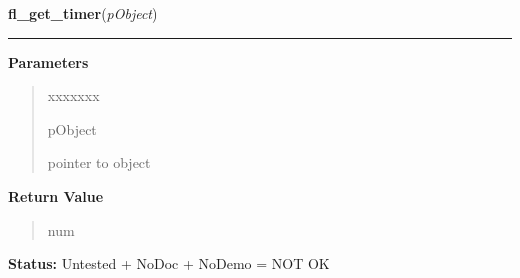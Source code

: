 \hspace{.8\funcindent}\begin{boxedminipage}{\funcwidth}

    \raggedright \textbf{fl\_get\_timer}(\textit{pObject})

    \vspace{-1.5ex}

    \rule{\textwidth}{0.5\fboxrule}
\setlength{\parskip}{2ex}
\setlength{\parskip}{1ex}
      \textbf{Parameters}
      \vspace{-1ex}

      \begin{quote}
        \begin{Ventry}{xxxxxxx}

          \item[pObject]

          pointer to object

        \end{Ventry}

      \end{quote}

      \textbf{Return Value}
    \vspace{-1ex}

      \begin{quote}
      num

      \end{quote}

\textbf{Status:} Untested + NoDoc + NoDemo = NOT OK



    \end{boxedminipage}

    \label{xformslib:library:fl_set_timer_countup}

    \vspace{0.5ex}

